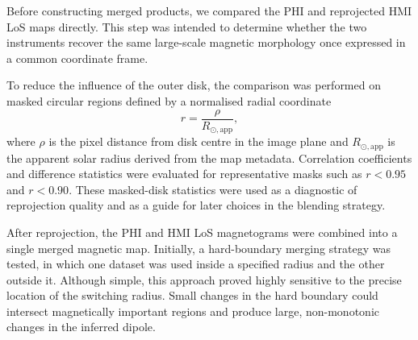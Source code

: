 \documentclass[namedreferences,hyperref,optionalrh]{spr-sola}
\begin{document}
Before constructing merged products, we compared the PHI and reprojected HMI LoS maps directly. This step was intended to determine whether the two instruments recover the same large-scale magnetic morphology once expressed in a common coordinate frame.

To reduce the influence of the outer disk, the comparison was performed on masked circular regions defined by a normalised radial coordinate
\begin{equation}
    r = \frac{\rho}{R_{\odot,\mathrm{app}}},
\end{equation}
where $\rho$ is the pixel distance from disk centre in the image plane and $R_{\odot,\mathrm{app}}$ is the apparent solar radius derived from the map metadata. Correlation coefficients and difference statistics were evaluated for representative masks such as $r<0.95$ and $r<0.90$. These masked-disk statistics were used as a diagnostic of reprojection quality and as a guide for later choices in the blending strategy.


After reprojection, the PHI and HMI LoS magnetograms were combined into a single merged magnetic map. Initially, a hard-boundary merging strategy was tested, in which one dataset was used inside a specified radius and the other outside it. Although simple, this approach proved highly sensitive to the precise location of the switching radius. Small changes in the hard boundary could intersect magnetically important regions and produce large, non-monotonic changes in the inferred dipole.
\end{document}
